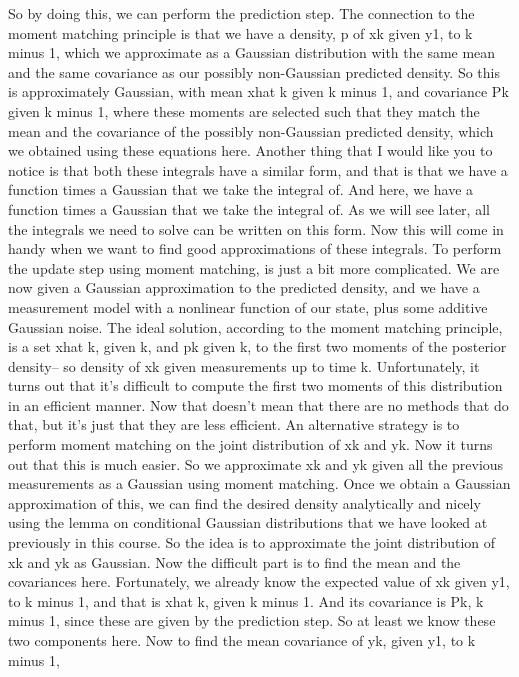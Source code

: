 So by doing this, we can perform the prediction step.
The connection to the moment matching principle
is that we have a density, p of xk given y1,
to k minus 1, which we approximate as a Gaussian
distribution with the same mean and the same covariance
as our possibly non-Gaussian predicted density.
So this is approximately Gaussian,
with mean xhat k given k minus 1,
and covariance Pk given k minus 1, where these moments are
selected such that they match the mean and the covariance
of the possibly non-Gaussian predicted density, which
we obtained using these equations here.
Another thing that I would like you to notice
is that both these integrals have a similar form,
and that is that we have a function times a Gaussian
that we take the integral of.
And here, we have a function times a Gaussian
that we take the integral of.
As we will see later, all the integrals we need to solve
can be written on this form.
Now this will come in handy when we
want to find good approximations of these integrals.
To perform the update step using moment matching,
is just a bit more complicated.
We are now given a Gaussian approximation
to the predicted density, and we have a measurement model
with a nonlinear function of our state,
plus some additive Gaussian noise.
The ideal solution, according to the moment matching principle,
is a set xhat k, given k, and pk given k,
to the first two moments of the posterior density--
so density of xk given measurements up to time k.
Unfortunately, it turns out that it's
difficult to compute the first two
moments of this distribution in an efficient manner.
Now that doesn't mean that there are no methods that do that,
but it's just that they are less efficient.
An alternative strategy is to perform moment matching
on the joint distribution of xk and yk.
Now it turns out that this is much easier.
So we approximate xk and yk given
all the previous measurements as a Gaussian
using moment matching.
Once we obtain a Gaussian approximation of this,
we can find the desired density analytically
and nicely using the lemma on conditional Gaussian
distributions that we have looked
at previously in this course.
So the idea is to approximate the joint distribution
of xk and yk as Gaussian.
Now the difficult part is to find the mean
and the covariances here.
Fortunately, we already know the expected value of xk given y1,
to k minus 1, and that is xhat k, given k minus 1.
And its covariance is Pk, k minus 1,
since these are given by the prediction step.
So at least we know these two components here.
Now to find the mean covariance of yk, given y1, to k minus 1,
